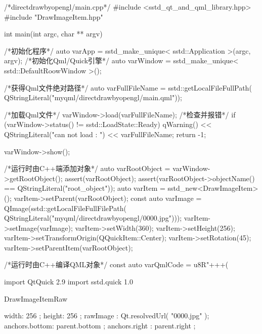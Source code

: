 \label{f000044}    %
\FloatBarrier                                  %
\begin{thebookfilesourceone}[escapeinside={(*@}{@*)},
caption=GoodLuck,
title=\filesourcenumbernameone \thefilesourcenumber
]
/*directdrawbyopengl/main.cpp*/
#include <sstd_qt_and_qml_library.hpp>
#include "DrawImageItem.hpp"

int main(int argc, char ** argv) {

    /*初始化程序*/
    auto varApp = sstd_make_unique< sstd::Application >(argc, argv);
    /*初始化Qml/Quick引擎*/
    auto varWindow = sstd_make_unique< sstd::DefaultRoowWindow >();
    {
        /*获得Qml文件绝对路径*/
        auto varFullFileName = sstd::getLocalFileFullPath(
            QStringLiteral("myqml/directdrawbyopengl/main.qml"));

        /*加载Qml文件*/
        varWindow->load(varFullFileName);
        /*检查并报错*/
        if (varWindow->status() != sstd::LoadState::Ready) {
            qWarning() << QStringLiteral("can not load : ")
            << varFullFileName;
            return -1;
        }

    }

    varWindow->show();

    {
        /*运行时由C++端添加对象*/
        auto varRootObject = varWindow->getRootObject();
        assert(varRootObject);
        assert(varRootObject->objectName() == QStringLiteral("root_object"));
        auto varItem = sstd_new<DrawImageItem>();
        varItem->setParent(varRootObject);
        const auto varImage = QImage(sstd::getLocalFileFullFilePath(
            QStringLiteral("myqml/directdrawbyopengl/0000.jpg")));
        varItem->setImage(varImage);
        varItem->setWidth(360);
        varItem->setHeight(256);
        varItem->setTransformOrigin(QQuickItem::Center);
        varItem->setRotation(45);
        varItem->setParentItem(varRootObject);
    }

    {
        /*运行时由C++编译QML对象*/
        const auto varQmlCode = u8R"+++(

import QtQuick 2.9
import sstd.quick 1.0

DrawImageItemRaw {

    width: 256                             ;
    height: 256                            ;
    rawImage : Qt.resolvedUrl( "0000.jpg" );
    anchors.bottom: parent.bottom          ;
    anchors.right : parent.right           ;

}}}
\end{thebookfilesourceone}
